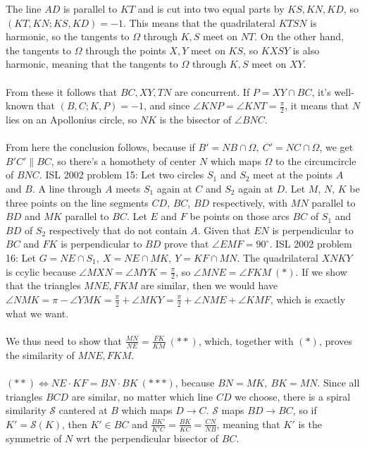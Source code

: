 The line $AD$ is parallel to $KT$ and is cut into two equal parts by $KS,KN,KD$, so $(KT,KN;KS,KD)=-1$. This means that the quadrilateral $KTSN$ is harmonic, so the tangents to $\Omega$ through $K,S$ meet on $NT$. On the other hand, the tangents to $\Omega$ through the points $X,Y$ meet on $KS$, so $KXSY$ is also harmonic, meaning that the tangents to $\Omega$ through $K,S$ meet on $XY$. \\\\
From these it follows that $BC,XY,TN$ are concurrent. If $P=XY\cap BC$, it's well-known that $(B,C;K,P)=-1$, and since $\angle KNP=\angle KNT=\frac{\pi}2$, it means that $N$ lies on an Apollonius circle, so $NK$ is the bisector of $\angle BNC$. \\\\
From here the conclusion follows, because if $B'=NB\cap \Omega,\ C'=NC\cap \Omega$, we get $B'C'\|BC$, so there's a homothety of center $N$ which maps $\Omega$ to the circumcircle of $BNC$. 
ISL 2002 problem 15:  Let two circles $S_1$ and $S_2$ meet at the points $A$ and $B$. A line through $A$ meets $S_1$ again at $C$ and $S_2$ again at $D$. Let $M$, $N$, $K$ be three points on the line segments $CD$, $BC$, $BD$ respectively, with $MN$ parallel to $BD$ and $MK$ parallel to $BC$. Let $E$ and $F$ be points on those arcs $BC$ of $S_1$ and $BD$ of $S_2$ respectively that do not contain $A$. Given that $EN$ is perpendicular to $BC$ and $FK$ is perpendicular to $BD$ prove that $\angle EMF=90^{\circ}$. 
ISL 2002 problem 16:  Let $G=NE\cap S_1,\ X=NE\cap MK,\ Y=KF\cap MN$. The quadrilateral $XNKY$ is ccylic because $\angle MXN=\angle MYK=\frac \pi 2$, so $\angle MNE=\angle FKM\ (*)$. If we show that the triangles $MNE,FKM$ are similar, then we would have $\angle NMK=\pi-\angle YMK=\frac \pi 2+\angle MKY=\frac \pi 2+\angle NME+\angle KMF$, which is exactly what we want. \\\\
We thus need to show that $\frac{MN}{NE}=\frac{FK}{KM}\ (**)$, which, together with $(*)$, proves the similarity of $MNE,FKM$. \\\\
$(**)\iff NE\cdot KF=BN\cdot BK\ (***)$, because $BN=MK,\ BK=MN$. Since all triangles $BCD$ are similar, no matter which line $CD$ we choose, there is a spiral similarity $\mathcal S$ cantered at $B$ which maps $D\to C$. $\mathcal S$ maps $BD\to BC$, so if $K'=\mathcal S(K)$, then $K'\in BC$ and $\frac{BK'}{K'C}=\frac{BK}{KC}=\frac{CN}{NB}$, meaning that $K'$ is the symmetric of $N$ wrt the perpendicular bisector of $BC$. \\\\
